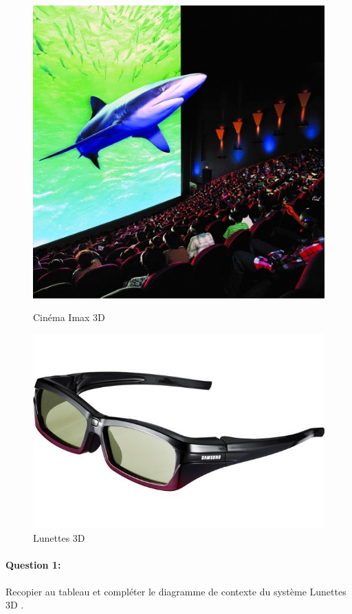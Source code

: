 \begin{figure}[htbp]
\begin{minipage}[c]{.40\linewidth}
\begin{center}
\includegraphics[width=\linewidth]{img/cine.jpg}
\caption{Cinéma Imax 3D}
\label{fig:image6}
\end{center}
\end{minipage}
\hfill
\begin{minipage}[c]{.55\linewidth}
\begin{center}
\includegraphics[width=0.5\linewidth]{img/lunettes.jpg}
\caption{Lunettes 3D}
\label{fig:image7}
\end{center}
\end{minipage}
\end{figure}

\paragraph{Question 1:} Recopier au tableau et compléter le diagramme de contexte du système \og Lunettes 3D \fg.

